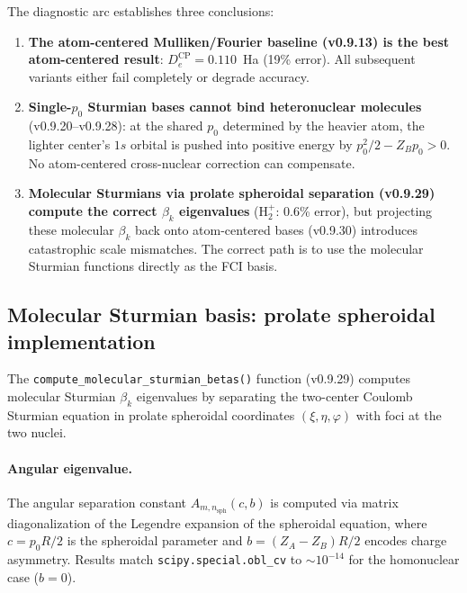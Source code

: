 \documentclass[aps,pra,twocolumn,superscriptaddress,longbibliography,floatfix]{revtex4-2}
\begin{document}
The diagnostic arc establishes three conclusions:

\begin{enumerate}
\item \textbf{The atom-centered Mulliken/Fourier baseline (v0.9.13) is
the best atom-centered result}: $D_e^{\text{CP}} = 0.110$~Ha (19\%
error).  All subsequent variants either fail completely or degrade
accuracy.

\item \textbf{Single-$p_0$ Sturmian bases cannot bind heteronuclear
molecules} (v0.9.20--v0.9.28): at the shared $p_0$ determined by the
heavier atom, the lighter center's $1s$ orbital is pushed into positive
energy by $p_0^2/2 - Z_B p_0 > 0$.  No atom-centered cross-nuclear
correction can compensate.

\item \textbf{Molecular Sturmians via prolate spheroidal separation
(v0.9.29) compute the correct $\beta_k$ eigenvalues} (H$_2^+$: 0.6\%
error), but projecting these molecular $\beta_k$ back onto atom-centered
bases (v0.9.30) introduces catastrophic scale mismatches.  The correct
path is to use the molecular Sturmian functions directly as the FCI
basis.
\end{enumerate}


\subsection{Molecular Sturmian basis: prolate spheroidal implementation}
\label{sec:prolate}

The \texttt{compute\_molecular\_sturmian\_betas()} function (v0.9.29)
computes molecular Sturmian $\beta_k$ eigenvalues by separating the
two-center Coulomb Sturmian equation in prolate spheroidal coordinates
$(\xi, \eta, \varphi)$ with foci at the two nuclei.

\paragraph{Angular eigenvalue.}
The angular separation constant $A_{m,n_{\text{sph}}}(c, b)$ is computed
via matrix diagonalization of the Legendre expansion of the spheroidal
equation, where $c = p_0 R/2$ is the spheroidal parameter and
$b = (Z_A - Z_B)R/2$ encodes charge asymmetry.  Results match
\texttt{scipy.special.obl\_cv} to $\sim 10^{-14}$ for the homonuclear
case ($b = 0$).
\end{document}
